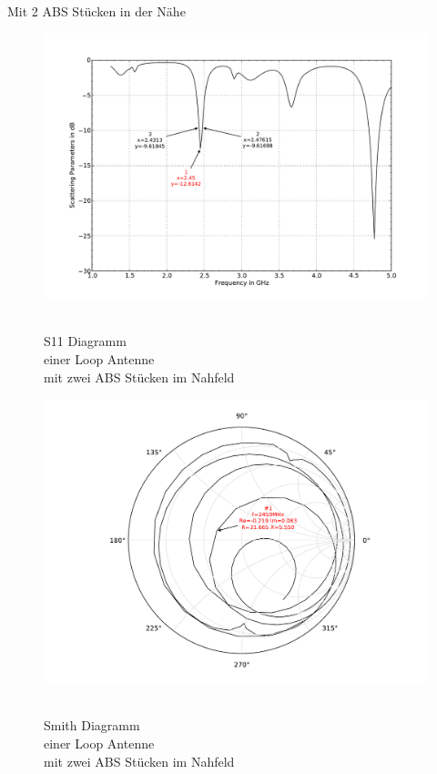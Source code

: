 Mit 2 ABS Stücken in der Nähe
\begin{figure}[!ht]
\begin{center}
  \includegraphics[width=\linewidth]{content/bilder/Evaluation/Loop/Kurz3/S11Loop2ABS.pdf}
  \caption{\\S11 Diagramm \\einer Loop Antenne \\mit zwei ABS Stücken im Nahfeld}\label{fig:S11_Loop_2ABS_5}
\endminipage%
{}
  \includegraphics[width=\linewidth]{content/bilder/Evaluation/Loop/Kurz3/SmithLoop2ABS.pdf}
  \caption{\\Smith Diagramm \\einer Loop Antenne \\mit zwei ABS Stücken im Nahfeld}\label{fig:Smith_Loop_2ABS_6}
\endminipage
\end{center}
\end{figure}

